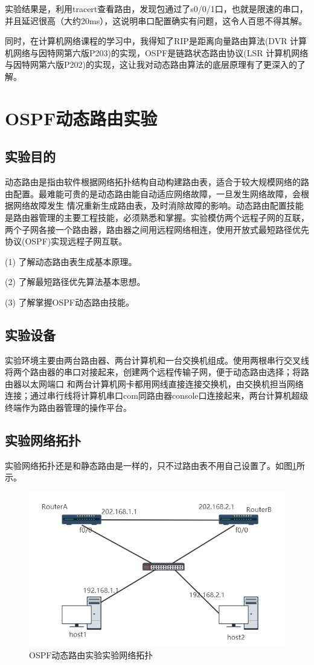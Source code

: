 \documentclass[lang=cn,11pt,a4paper,cite=authoryear]{elegantpaper}
\begin{document}
实验结果是，利用tracert查看路由，发现包通过了s0/0/1口，也就是限速的串口，并且延迟很高（大约20ms），这说明串口配置确实有问题，这令人百思不得其解。

同时，在计算机网络课程的学习中，我得知了RIP是距离向量路由算法(DVR 计算机网络与因特网第六版P203)的实现，OSPF是链路状态路由协议(LSR 计算机网络与因特网第六版P202)的实现，这让我对动态路由算法的底层原理有了更深入的了解。

\section{OSPF动态路由实验}
\subsection{实验目的}

动态路由是指由软件根据网络拓扑结构自动构建路由表，适合于较大规模网络的路由配置。最难能可贵的是动态路由能自动适应网络故障，一旦发生网络故障，会根据网络故障发生 情况重新生成路由表，及时消除故障的影响。动态路由配置技能是路由器管理的主要工程技能，必须熟悉和掌握。实验模仿两个远程子网的互联，两个子网各接一个路由器，路由器之间用远程网络相连，使用开放式最短路径优先协议(OSPF)实现远程子网互联。

(1)	了解动态路由表生成基本原理。

(2)	了解最短路径优先算法基本思想。

(3)	了解掌握OSPF动态路由技能。


\subsection{实验设备}

实验环境主要由两台路由器、两台计算机和一台交换机组成。使用两根串行交叉线将两个路由器的串口对接起来，创建两个远程传输子网，便于动态路由选择；将路由器以太网端口 和两台计算机网卡都用网线直接连接交换机，由交换机担当网络连接；通过串行线将计算机串口com同路由器console口连接起来，两台计算机超级终端作为路由器管理的操作平台。

\subsection{实验网络拓扑}

实验网络拓扑还是和静态路由是一样的，只不过路由表不用自己设置了。如图\ref{fig:screenshot024-3}所示。

\begin{figure}[htbp]
	\centering
	\includegraphics[width=0.7\linewidth]{image/screenshot024}
	\caption{OSPF动态路由实验实验网络拓扑}
	\label{fig:screenshot024-3}
\end{figure}
\end{document}
